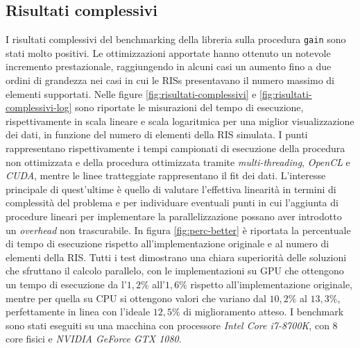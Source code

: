 \subsection{Risultati complessivi}
\label{subsec:risultati-complessivi}

I risultati complessivi del benchmarking della libreria sulla procedura \texttt{gain}
sono stati molto positivi. Le ottimizzazioni apportate hanno ottenuto un
notevole incremento prestazionale, raggiungendo in alcuni casi un aumento fino a
due ordini di grandezza nei casi in cui le RISs presentavano il numero massimo di
elementi supportati. Nelle figure \ref{fig:risultati-complessivi} e
\ref{fig:risultati-complessivi-log} sono riportate le misurazioni del tempo di
esecuzione, rispettivamente in scala lineare e scala logaritmica per una miglior
visualizzazione dei dati, in funzione del numero di elementi della RIS simulata.
I punti rappresentano rispettivamente i tempi campionati di esecuzione della procedura
non ottimizzata e della procedura ottimizzata tramite \textit{multi-threading}, \textit{OpenCL}
e \textit{CUDA}, mentre le linee tratteggiate rappresentano il fit dei dati. L'interesse
principale di quest'ultime è quello di valutare l'effettiva linearità in termini
di complessità del problema e per individuare eventuali punti in cui l'aggiunta di
procedure lineari per implementare la parallelizzazione possano aver introdotto un
\textit{overhead} non trascurabile. In figura \ref{fig:perc-better} è riportata la
percentuale di tempo di esecuzione rispetto all'implementazione originale e al numero
di elementi della RIS. Tutti i test dimostrano una chiara superiorità delle
soluzioni che sfruttano il calcolo parallelo, con le implementazioni su GPU che ottengono
un tempo di esecuzione da l'$1,2\%$ all'$1,6\%$ rispetto all'implementazione originale,
mentre per quella su CPU si ottengono valori che variano dal $10,2\%$ al
$13,3\%$, perfettamente in linea con l'ideale $12,5\%$ di miglioramento atteso.
I benchmark sono stati eseguiti su una macchina con processore \textit{Intel
Core i7-8700K}, con $8$ core fisici e \textit{NVIDIA GeForce GTX 1080}.

